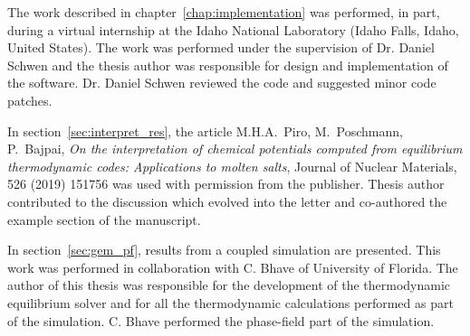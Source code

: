 The work described in chapter~\ref{chap:implementation} was performed, in part, during a virtual internship at the Idaho National Laboratory (Idaho Falls, Idaho, United States). The work was performed under the supervision of Dr. Daniel Schwen and the thesis author was responsible for design and implementation of the software. Dr. Daniel Schwen reviewed the code and suggested minor code patches.

In section~\ref{sec:interpret_res}, the article {M.H.A.\ Piro}, {M.\ Poschmann}, {P.\ Bajpai}, \textit{On the interpretation of chemical potentials computed from equilibrium thermodynamic codes: Applications to molten salts}, {Journal of Nuclear Materials, 526 (2019) 151756} was used with permission from the publisher. Thesis author contributed to the discussion which evolved into the letter and co-authored the example section of the manuscript.

In section~\ref{sec:gem_pf}, results from a coupled simulation are presented. This work was performed in collaboration with C. Bhave of University of Florida. The author of this thesis was responsible for the development of the thermodynamic equilibrium solver and for all the thermodynamic calculations performed as part of the simulation. C. Bhave performed the phase-field part of the simulation.